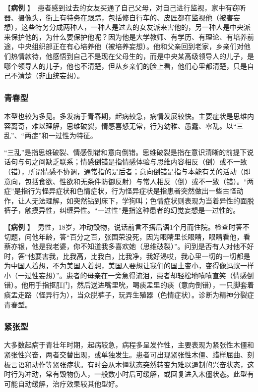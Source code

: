 【\textbf{病例}
】　{患者感到过去的女友买通了自己父母，对自己进行监视，家中有窃听器、摄像头，街上有特务在跟踪，包括修自行车的、皮匠都在监视他（被害妄想），这些特务分成两种人，一种人是过去的女友派来害他的，另一种人是中央派来保护他的，为什么要保护他呢？因为他是大学教师、有学历、有理论、有培养前途，中央组织部正在有心培养他（被培养妄想）。他和父亲回到老家，乡亲们对他们热情款待，他感悟到自己不是现在父母生的，而是中央某高级领导人的儿子，是哪个领导人的儿子，他也不清楚，但从乡亲们的脸上看，他们心里都清楚，只是自己不清楚（非血统妄想）。}

\subsubsection{青春型}

本型也较为多见。多发病于青春期，起病较急，病情发展较快。主要症状是思维内容离奇，难以理解，思维破裂，情感喜怒无常，行为幼稚、愚蠢、零乱。以“三乱”、“两症”和一过性为特征。

“三乱”是指思维破裂、情感倒错和意向倒错。思维破裂是指在意识清晰的前提下说话句与句之间缺乏联系；情感倒错是指情感体验与思维内容相反（倒）或不一致（错），所谓情感不协调，通常指的是后者；意向倒错是指与本能有关的活动（即意向，包括食欲、性欲和无条件防御反射）与常人相反（倒）或不一致（错）。“两症”是指行为怪异症状和色情症状，行为怪异症状是指患者突然做出一些古怪动作，让人无法理解，如突然钻到床下，学狗叫；色情症状则表现为当着异性的面脱裤子，触摸异性，纠缠异性。“一过性”是指这种患者的幻觉妄想是一过性的。

【\textbf{病例}
】　{男性，18岁，冲动毁物，说话前言不搭后语1个月而住院。检查时答不切题，问他年龄，答“百分之百，张国荣没死，因为眼睛里长眼睛，眼睛看他，看蔡亦银，他是我老婆，你不知道我多喜欢她（思维破裂）”。问到是否有人对他不好时，答“他要害我，比我高，比我白，比我净，我好渴哎，我心里一切的一切都是为中国人着想，不为美国人着想，美国人要想让我们的国土变小，变得像蚂蚁一样小（一过性妄想）”。患者的母亲在一旁急得流泪，患者却轻松地嘻嘻直笑（情感倒错）。他用手指抠肛门，然后送进嘴里吮，喝痰盂里的痰（意向倒错），一只脚套着痰盂走路（怪异行为），当众脱裤子，玩弄生殖器（色情症状）。诊断为精神分裂症青春型。}

\subsubsection{紧张型}

大多数起病于青壮年时期，起病较急，病程多呈发作性，主要表现为紧张性木僵和紧张性兴奋，两者交替出现，或单独发生。患者可出现紧张性木僵、蜡样屈曲、刻板言语和动作等紧张症状。有时会从木僵状态突然转变为难以遏制的兴奋状态，这时行为冲动，常有毁物伤人，一般数小时后可缓解，或回复进入木僵状态。此型有可能自动缓解，治疗效果较其他型好。

